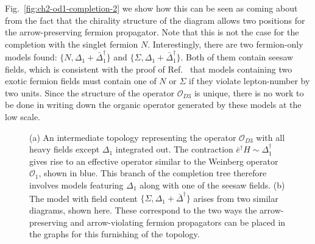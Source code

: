 Fig.~\ref{fig:ch2-od1-completion-2} we show how this can be seen as coming about
from the fact that the chirality structure of the diagram allows two positions
for the arrow-preserving fermion propagator. Note that this is not the case for
the completion with the singlet fermion $N$. Interestingly, there are two
fermion-only models found: $\{N, \Delta_{1} + \bar{\Delta}^{\dagger}_{1}\}$ and
$\{\Sigma, \Delta_{1} + \bar{\Delta}^{\dagger}_{1}\}$. Both of them contain
seesaw fields, which is consistent with the proof of Ref.~\cite{Klein:2019iws}
that models containing two exotic fermion fields must contain one of $N$ or
$\Sigma$ if they violate lepton-number by two units. Since the structure of the
operator $\mathcal{O}_{D3}$ is unique, there is no work to be done in writing
down the organic operator generated by these models at the low scale.

\begin{figure}[t]
  \centering
  \caption[(a) An intermediate topology representing the operator
  $\mathcal{O}_{D3}$ with all heavy fields except $\Delta_{1}$ integrated out.
  (b) The model with field content
  $\{\Sigma, \Delta_{1} + \bar{\Delta}^{\dagger}\}$ arises from two similar
  diagrams, shown here.]{(a) An intermediate topology representing the operator
    $\mathcal{O}_{D3}$ with all heavy fields except $\Delta_{1}$ integrated out.
    The contraction $\bar{e}^{\dagger} H \sim \Delta^{\dagger}_{1}$ gives rise
    to an effective operator similar to the Weinberg operator $\mathcal{O}_{1}$,
    shown in blue. This branch of the completion tree therefore involves models
    featuring $\Delta_{1}$ along with one of the seesaw fields. (b) The model
    with field content $\{\Sigma, \Delta_{1} + \bar{\Delta}^{\dagger}\}$ arises
    from two similar diagrams, shown here. These correspond to the two ways the
    arrow-preserving and arrow-violating fermion propagators can be placed in
    the graphs for this furnishing of the topology.}
  \label{fig:ch2-od1-completion}
\end{figure}

